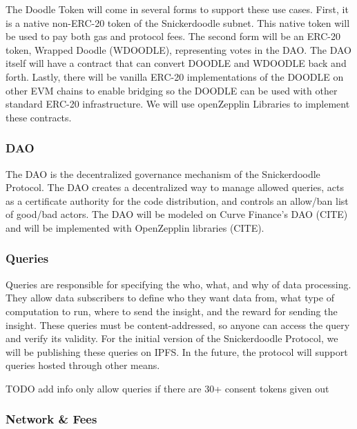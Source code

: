 The Doodle Token will come in several forms to support these use cases. First, it is a native non-ERC-20 token of the Snickerdoodle subnet. This native token will be used to pay both gas and protocol fees. The second form will be an ERC-20 token, Wrapped Doodle (WDOODLE), representing votes in the DAO. The DAO itself will have a contract that can convert DOODLE and WDOODLE back and forth. Lastly, there will be vanilla ERC-20 implementations of the DOODLE on other EVM chains to enable bridging so the DOODLE can be used with other standard ERC-20 infrastructure. We will use openZepplin Libraries to implement these contracts. 


\subsubsection{DAO}
\label{section:ImplementationDAO}
The DAO is the decentralized governance mechanism of the Snickerdoodle Protocol. The DAO creates a decentralized way to manage allowed queries, acts as a certificate authority for the code distribution, and controls an allow/ban list of good/bad actors. The DAO will be modeled on Curve Finance's DAO (CITE) and will be implemented with OpenZepplin libraries (CITE). 

\subsubsection{Queries}
Queries are responsible for specifying the who, what, and why of data processing. They allow data subscribers to define who they want data from, what type of computation to run, where to send the insight, and the reward for sending the insight. These queries must be content-addressed, so anyone can access the query and verify its validity. For the initial version of the Snickerdoodle Protocol, we will be publishing these queries on IPFS. In the future, the protocol will support queries hosted through other means.

TODO add info only allow queries if there are 30+ consent tokens given out

\subsubsection{Network \& Fees}


